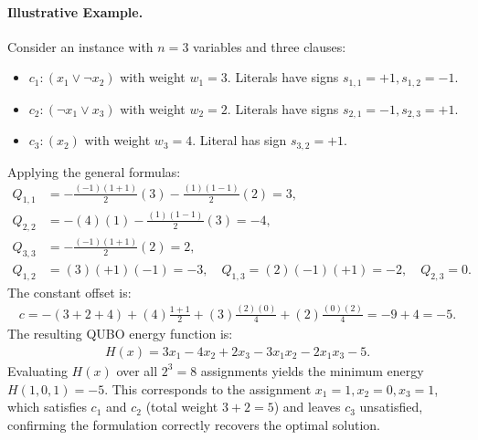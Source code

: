 \documentclass[12pt]{article}
\begin{document}
\paragraph{Illustrative Example.}
Consider an instance with $n=3$ variables and three clauses:
\begin{itemize}
    \item $c_1: (x_1 \lor \neg x_2)$ with weight $w_1 = 3$. Literals have signs $s_{1,1}=+1, s_{1,2}=-1$.
    \item $c_2: (\neg x_1 \lor x_3)$ with weight $w_2 = 2$. Literals have signs $s_{2,1}=-1, s_{2,3}=+1$.
    \item $c_3: (x_2)$ with weight $w_3 = 4$. Literal has sign $s_{3,2}=+1$.
\end{itemize}
Applying the general formulas:
\begin{align}
    Q_{1,1} &= -\frac{(-1)(1+1)}{2}(3) - \frac{(1)(1-1)}{2}(2) = 3, \\
    Q_{2,2} &= -(4)(1) - \frac{(1)(1-1)}{2}(3) = -4, \\
    Q_{3,3} &= -\frac{(-1)(1+1)}{2}(2) = 2, \\
    Q_{1,2} &= (3)(+1)(-1) = -3, \quad Q_{1,3} = (2)(-1)(+1) = -2, \quad Q_{2,3} = 0.
\end{align}
The constant offset is:
\begin{align}
    c = -(3+2+4) + (4)\frac{1+1}{2} + (3)\frac{(2)(0)}{4} + (2)\frac{(0)(2)}{4} = -9 + 4 = -5.
\end{align}
The resulting QUBO energy function is:
\begin{align}
    H(x) = 3x_1 - 4x_2 + 2x_3 - 3x_1x_2 - 2x_1x_3 - 5.
\end{align}
Evaluating $H(x)$ over all $2^3=8$ assignments yields the minimum energy $H(1,0,1) = -5$. This corresponds to the assignment $x_1=1, x_2=0, x_3=1$, which satisfies $c_1$ and $c_2$ (total weight $3+2=5$) and leaves $c_3$ unsatisfied, confirming the formulation correctly recovers the optimal solution.
\end{document}
